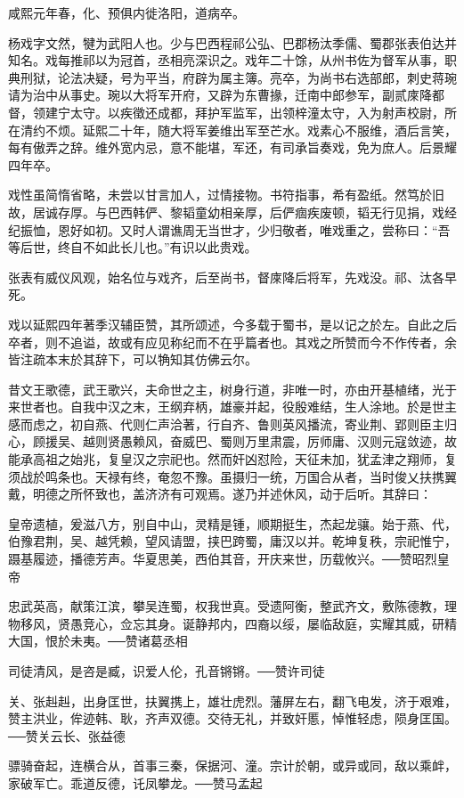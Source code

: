 \documentclass[12pt,UTF8]{ctexbook}
\begin{document}
咸熙元年春，化、预俱内徙洛阳，道病卒。

杨戏字文然，犍为武阳人也。少与巴西程祁公弘、巴郡杨汰季儒、蜀郡张表伯达并知名。戏每推祁以为冠首，丞相亮深识之。戏年二十馀，从州书佐为督军从事，职典刑狱，论法决疑，号为平当，府辟为属主簿。亮卒，为尚书右选部郎，刺史蒋琬请为治中从事史。琬以大将军开府，又辟为东曹掾，迁南中郎参军，副贰庲降都督，领建宁太守。以疾徵还成都，拜护军监军，出领梓潼太守，入为射声校尉，所在清约不烦。延熙二十年，随大将军姜维出军至芒水。戏素心不服维，酒后言笑，每有傲弄之辞。维外宽内忌，意不能堪，军还，有司承旨奏戏，免为庶人。后景耀四年卒。

戏性虽简惰省略，未尝以甘言加人，过情接物。书符指事，希有盈纸。然笃於旧故，居诚存厚。与巴西韩俨、黎韬童幼相亲厚，后俨痼疾废顿，韬无行见捐，戏经纪振恤，恩好如初。又时人谓谯周无当世才，少归敬者，唯戏重之，尝称曰：“吾等后世，终自不如此长儿也。”有识以此贵戏。

张表有威仪风观，始名位与戏齐，后至尚书，督庲降后将军，先戏没。祁、汰各早死。

戏以延熙四年著季汉辅臣赞，其所颂述，今多载于蜀书，是以记之於左。自此之后卒者，则不追谥，故或有应见称纪而不在乎篇者也。其戏之所赞而今不作传者，余皆注疏本末於其辞下，可以觕知其仿佛云尔。

昔文王歌德，武王歌兴，夫命世之主，树身行道，非唯一时，亦由开基植绪，光于来世者也。自我中汉之末，王纲弃柄，雄豪并起，役殷难结，生人涂地。於是世主感而虑之，初自燕、代则仁声洽著，行自齐、鲁则英风播流，寄业荆、郢则臣主归心，顾援吴、越则贤愚赖风，奋威巴、蜀则万里肃震，厉师庸、汉则元寇敛迹，故能承高祖之始兆，复皇汉之宗祀也。然而奸凶怼险，天征未加，犹孟津之翔师，复须战於鸣条也。天禄有终，奄忽不豫。虽摄归一统，万国合从者，当时俊乂扶携翼戴，明德之所怀致也，盖济济有可观焉。遂乃并述休风，动于后听。其辞曰：

皇帝遗植，爰滋八方，别自中山，灵精是锺，顺期挺生，杰起龙骧。始于燕、代，伯豫君荆，吴、越凭赖，望风请盟，挟巴跨蜀，庸汉以并。乾坤复秩，宗祀惟宁，蹑基履迹，播德芳声。华夏思美，西伯其音，开庆来世，历载攸兴。──赞昭烈皇帝

忠武英高，献策江滨，攀吴连蜀，权我世真。受遗阿衡，整武齐文，敷陈德教，理物移风，贤愚竞心，佥忘其身。诞静邦内，四裔以绥，屡临敌庭，实耀其威，研精大国，恨於未夷。──赞诸葛丞相

司徒清风，是咨是臧，识爱人伦，孔音锵锵。──赞许司徒

关、张赳赳，出身匡世，扶翼携上，雄壮虎烈。藩屏左右，翻飞电发，济于艰难，赞主洪业，侔迹韩、耿，齐声双德。交待无礼，并致奸慝，悼惟轻虑，陨身匡国。──赞关云长、张益德

骠骑奋起，连横合从，首事三秦，保据河、潼。宗计於朝，或异或同，敌以乘衅，家破军亡。乖道反德，讬凤攀龙。──赞马孟起
\end{document}
